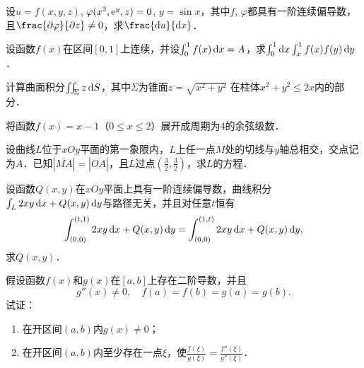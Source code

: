 \documentclass[plain,noanswer,medmath]{../../template/jnuexam}
\begin{document}


\begin{problem}
设$u = f(x,y,z)$, $\varphi (x^2,\mathrm{e}^y,z) = 0$, $y = \sin x$，其中$f$, $\varphi$都具有一阶连续偏导数，且$\frac{\pd \varphi}{\pdz} \ne 0$，求$\frac{\du}{\dx}$．
\end{problem}


\begin{problem}
设函数$f(x)$在区间$[0,1]$上连续，并设$\int_0^1f(x)\mathop{}\!\mathrm{d} x = A$，求$\int_0^1\mathop{}\!\mathrm{d} x\int_x^1f(x)f(y)\mathop{}\!\mathrm{d} y$．
\end{problem}




\begin{problem}
计算曲面积分$\iint_{\Sigma}z\mathop{}\!\mathrm{d} S$，其中$\Sigma$为锥面$z = \sqrt{x^2 + y^2}$
在柱体$x^2 + y^2 \le 2x$内的部分．
\end{problem}


\begin{problem}
将函数$f(x) = x - 1$（$0 \le x \le 2$）展开成周期为$4$的余弦级数．
\end{problem}



\begin{problem}
设曲线$L$位于$xOy$平面的第一象限内，$L$上任一点$M$处的切线与$y$轴总相交，交点记为$A$．已知$\left| \overline{MA} \right| = \left| \overline{OA} \right|$，且$L$过点$\left(\frac{3}{2},\frac{3}{2} \right)$，求$L$的方程．
\end{problem}



\begin{problem}
设函数$Q(x,y)$在$xOy$平面上具有一阶连续偏导数，曲线积分$\int_L 2xy\mathop{}\!\mathrm{d} x + Q(x,y)\mathop{}\!\mathrm{d} y$与路径无关，并且对任意$t$恒有
$$\int_{(0,0)}^{(t,1)} 2xy\mathop{}\!\mathrm{d} x + Q(x,y)\mathop{}\!\mathrm{d} y = \int_{(0,0)}^{(1,t)} 2xy\mathop{}\!\mathrm{d} x + Q(x,y)\mathop{}\!\mathrm{d} y ,$$
求$Q(x,y)$．
\end{problem}



\begin{problem}
假设函数$f(x)$和$g(x)$在$[a,b]$上存在二阶导数，并且
$$g''(x) \ne 0,\quad f(a) = f(b) = g(a) = g(b).$$
试证：
\begin{enumerate}
\item 在开区间$(a,b)$内$g(x) \ne 0$；
\item 在开区间$(a,b)$内至少存在一点$\xi$，使$\frac{f(\xi)}{g(\xi)} = \frac{f''(\xi)}{g''(\xi)}$．
\end{enumerate}
\end{problem}
\end{document}
